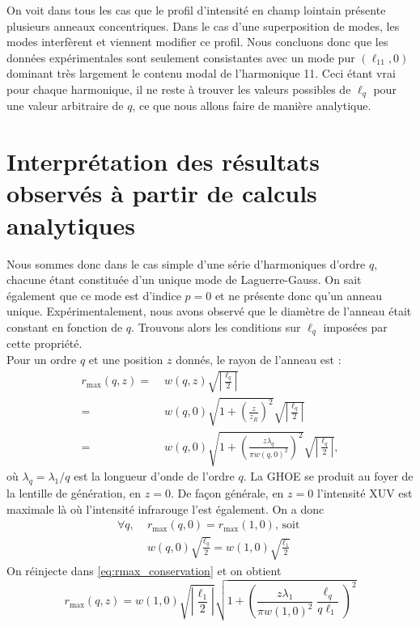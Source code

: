 On voit dans tous les cas que le profil d'intensité en champ lointain présente plusieurs anneaux concentriques. Dans le cas d'une superposition de modes, les modes interfèrent et viennent modifier ce profil. Nous concluons donc que les données expérimentales sont seulement consistantes avec un mode pur $(\ell_{11},0)$ dominant très largement le contenu modal de l'harmonique 11. Ceci étant vrai pour chaque harmonique, il ne reste à trouver les valeurs possibles de $\ell_q$ pour une valeur arbitraire de $q$, ce que nous allons faire de manière analytique.



\section{Interprétation des résultats observés à partir de calculs analytiques}
Nous sommes donc dans le cas simple d'une série d'harmoniques d'ordre $q$, chacune étant constituée d'un unique mode de Laguerre-Gauss. On sait également que ce mode est  d'indice $p=0$ et ne présente donc qu'un anneau unique. Expérimentalement, nous avons observé que le diamètre de l'anneau était constant en fonction de $q$. Trouvons alors les conditions sur $\ell_q$ imposées par cette propriété.\\

Pour un ordre $q$ et une position $z$ donnés, le rayon de l'anneau est :
\begin{align}
{r_{{\mathrm{max}}}}\left( {q,z} \right) =& \;w\left( {q,z} \right)\sqrt {\left| {\frac{{{\ell _q}}}{2}} \right|} \nonumber\\ 
=& \;w\left( {q,0} \right)\sqrt {1 + {{\left( {\frac{z}{z_R}} \right)}^2}} \sqrt {\left| {\frac{{{\ell _q}}}{2}} \right|} \nonumber\\
=& \;w\left( {q,0} \right)\sqrt {1 + {{\left( {\frac{{z\lambda _q}}{{{\pi w{{\left( {{q},0} \right)}^2}}}}} \right)}^2}} \sqrt {\left| {\frac{{{\ell _q}}}{2}} \right|},
\label{eq:rmax_conservation}
\end{align}
où ${\lambda _q} = {\lambda _1}/q$ est la longueur d'onde de l'ordre $q$. La GHOE se produit au foyer de la lentille de génération, en $z=0$. De façon générale, en $z=0$ l'intensité XUV est maximale là où l'intensité infrarouge l'est également. On a donc
\begin{align*}
\forall q,\;&{r_{{\mathrm{max}}}}\left( {q,0} \right)={r_{{\mathrm{max}}}}\left( {1,0} \right) \text{, soit }\\
&w\left( {{q},0} \right)\sqrt {\frac{{{\ell _q}}}{2}}  = w\left( {{1},0} \right)\sqrt {\frac{{{\ell _1}}}{2}}
\end{align*}
On réinjecte dans \ref{eq:rmax_conservation} et on obtient
\begin{equation*}
{r_{{\mathrm{max}}}}\left( {q,z} \right) = w\left( {{1},0} \right)\sqrt {\left| {\frac{{{\ell _1}}}{2}} \right|}\sqrt {1 + {{\left( {\frac{{{z\lambda_1}}}{\pi w{{\left( {{1},0} \right)}^2}}\frac{\ell _q}{q{\ell _1}}}\right)}^2}} 
\end{equation*}

